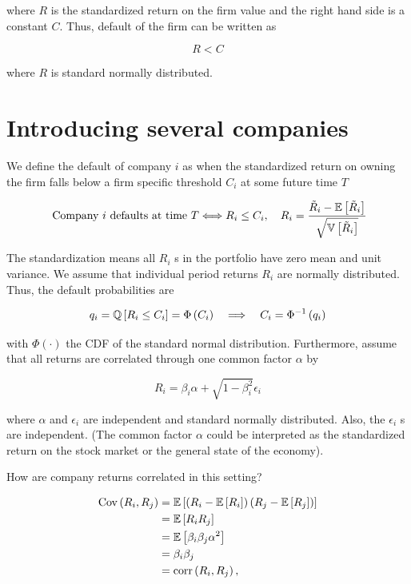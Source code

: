 where $R$ is the standardized return on the firm value and the right hand side is a constant $C$. Thus, default of the firm can be written as

$$
R<C
$$

where $R$ is standard normally distributed.

\section{Introducing several companies}
We define the default of company $i$ as when the standardized return on owning the firm falls below a firm specific threshold $C_{i}$ at some future time $T$

$$
\text { Company } i \text { defaults at time } T \Longleftrightarrow R_{i} \leq C_{i}, \quad R_{i}=\frac{\tilde{R}_{i}-\mathbb{E}\left[\tilde{R}_{i}\right]}{\sqrt{\mathbb{V}\left[\tilde{R}_{i}\right]}}
$$

The standardization means all $R_{i}$ s in the portfolio have zero mean and unit variance. We assume that individual period returns $R_{i}$ are normally distributed. Thus, the default probabilities are

$$
q_{i}=\mathbb{Q}\left[R_{i} \leq C_{i}\right]=\Phi\left(C_{i}\right) \quad \Longrightarrow \quad C_{i}=\Phi^{-1}\left(q_{i}\right)
$$

with $\Phi(\cdot)$ the CDF of the standard normal distribution. Furthermore, assume that all returns are correlated through one common factor $\alpha$ by

$$
R_{i}=\beta_{i} \alpha+\sqrt{1-\beta_{i}^{2}} \epsilon_{i}
$$

where $\alpha$ and $\epsilon_{i}$ are independent and standard normally distributed. Also, the $\epsilon_{i}$ s are independent. (The common factor $\alpha$ could be interpreted as the standardized return on the stock market or the general state of the economy).

How are company returns correlated in this setting?

$$
\begin{aligned}
\operatorname{Cov}\left(R_{i}, R_{j}\right) & =\mathbb{E}\left[\left(R_{i}-\mathbb{E}\left[R_{i}\right]\right)\left(R_{j}-\mathbb{E}\left[R_{j}\right]\right)\right] \\
& =\mathbb{E}\left[R_{i} R_{j}\right] \\
& =\mathbb{E}\left[\beta_{i} \beta_{j} \alpha^{2}\right] \\
& =\beta_{i} \beta_{j} \\
& =\operatorname{corr}\left(R_{i}, R_{j}\right),
\end{aligned}
$$

